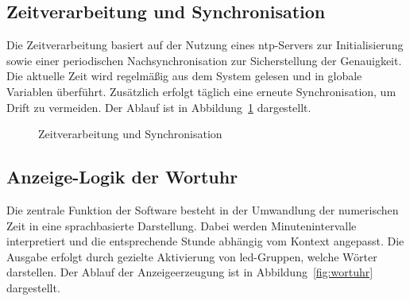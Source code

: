 \subsection{Zeitverarbeitung und Synchronisation}

Die Zeitverarbeitung basiert auf der Nutzung eines \gls{ntp}-Servers zur Initialisierung sowie einer periodischen Nachsynchronisation zur Sicherstellung der Genauigkeit. 
Die aktuelle Zeit wird regelmäßig aus dem System gelesen und in globale Variablen überführt. 
Zusätzlich erfolgt täglich eine erneute Synchronisation, um Drift zu vermeiden. 
Der Ablauf ist in Abbildung~\ref{fig:zeit} dargestellt.

\begin{figure}[H]
\centering
{}
\caption{Zeitverarbeitung und Synchronisation}
\label{fig:zeit}
\end{figure}

\subsection{Anzeige-Logik der Wortuhr}

Die zentrale Funktion der Software besteht in der Umwandlung der numerischen Zeit in eine sprachbasierte Darstellung. 
Dabei werden Minutenintervalle interpretiert und die entsprechende Stunde abhängig vom Kontext angepasst. 
Die Ausgabe erfolgt durch gezielte Aktivierung von \gls{led}-Gruppen, welche Wörter darstellen. 
Der Ablauf der Anzeigeerzeugung ist in Abbildung~\ref{fig:wortuhr} dargestellt.

